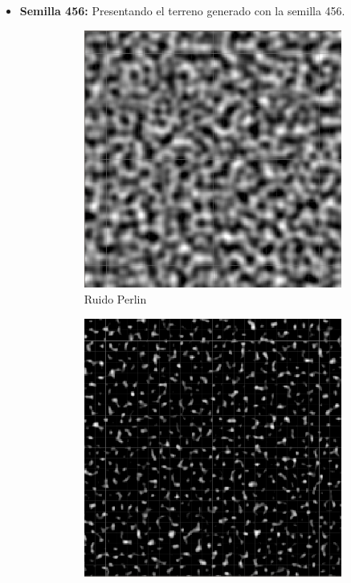 \begin{itemize}
    \newpage
    \item \textbf{Semilla 456:} Presentando el terreno generado con la semilla 456.
    \begin{figure}[ht]
        \begin{subfigure}{0.3\linewidth}
            \centering
            \includegraphics[width=\linewidth]{img/codes/Perlin456.png}
            \caption{Ruido Perlin}
        \end{subfigure}
        \hfill
        \begin{subfigure}{0.3\linewidth}
            \centering
            \includegraphics[width=\linewidth]{img/codes/Simplex456.png}

\end{subfigure}
\end{figure}
\end{itemize}
